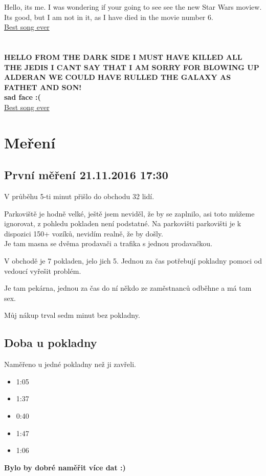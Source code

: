 \documentclass[12pt,a4paper]{report}
\begin{document}
Hello, its me. I was wondering if your going to see see the new Star Wars moview. Its good, but I am not in it, as I have died  in the movie number 6.\\ 
	\href{https://www.youtube.com/watch?v=aSf2C1Pd2Ns}{Best song ever}
\\ \\ \\ 

	\textbf{HELLO FROM THE DARK SIDE
	I MUST HAVE KILLED ALL THE JEDIS
	I CANT SAY THAT I AM SORRY FOR BLOWING UP ALDERAN
	WE COULD HAVE RULLED THE GALAXY AS FATHET AND SON! \\ sad face :(} \\
	\href{https://www.youtube.com/watch?v=UAMyh8DjCrQ}{Best song ever}

\chapter{Meření}
\section{První měření 21.11.2016 17:30}
V průběhu 5-ti minut přišlo do obchodu 32 lidí.

Parkoviště je hodně velké, ještě jsem neviděl, že by se zaplnilo, asi toto můžeme ignorovat, z pohledu pokladen není podstatné.
Na parkovišti parkovišti je k dispozici 150+ vozíků, nevidím realně, že by došly.
\\
Je tam masna se dvěma prodavači a trafika s jednou prodavačkou.

V obchodě je 7 pokladen, jelo jich 5. Jednou za čas potřebují pokladny pomoci od vedoucí vyřešit problém.

Je tam pekárna, jednou za čas do ní někdo ze zaměstnanců odběhne a má tam sex.

Můj nákup trval sedm minut bez pokladny.

\section{Doba u pokladny}
Naměřeno u jedné pokladny než ji zavřeli.
\begin{itemize}
\item 1:05
\item 1:37
\item 0:40
\item 1:47
\item 1:06
\end{itemize}

\textbf{Bylo by dobré naměřit více dat :) }
\end{document}
